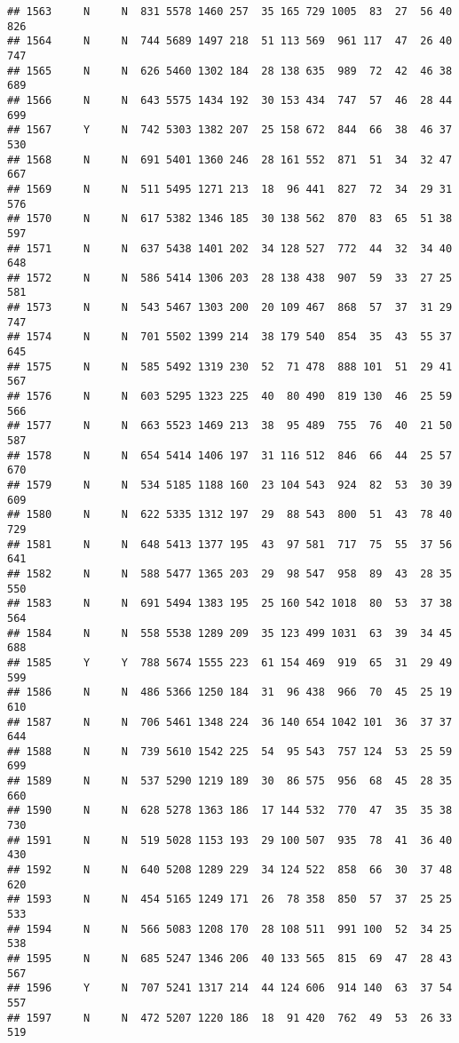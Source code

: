 \documentclass[]{article}
\begin{document}
\begin{verbatim}
## 1563     N     N  831 5578 1460 257  35 165 729 1005  83  27  56 40  826
## 1564     N     N  744 5689 1497 218  51 113 569  961 117  47  26 40  747
## 1565     N     N  626 5460 1302 184  28 138 635  989  72  42  46 38  689
## 1566     N     N  643 5575 1434 192  30 153 434  747  57  46  28 44  699
## 1567     Y     N  742 5303 1382 207  25 158 672  844  66  38  46 37  530
## 1568     N     N  691 5401 1360 246  28 161 552  871  51  34  32 47  667
## 1569     N     N  511 5495 1271 213  18  96 441  827  72  34  29 31  576
## 1570     N     N  617 5382 1346 185  30 138 562  870  83  65  51 38  597
## 1571     N     N  637 5438 1401 202  34 128 527  772  44  32  34 40  648
## 1572     N     N  586 5414 1306 203  28 138 438  907  59  33  27 25  581
## 1573     N     N  543 5467 1303 200  20 109 467  868  57  37  31 29  747
## 1574     N     N  701 5502 1399 214  38 179 540  854  35  43  55 37  645
## 1575     N     N  585 5492 1319 230  52  71 478  888 101  51  29 41  567
## 1576     N     N  603 5295 1323 225  40  80 490  819 130  46  25 59  566
## 1577     N     N  663 5523 1469 213  38  95 489  755  76  40  21 50  587
## 1578     N     N  654 5414 1406 197  31 116 512  846  66  44  25 57  670
## 1579     N     N  534 5185 1188 160  23 104 543  924  82  53  30 39  609
## 1580     N     N  622 5335 1312 197  29  88 543  800  51  43  78 40  729
## 1581     N     N  648 5413 1377 195  43  97 581  717  75  55  37 56  641
## 1582     N     N  588 5477 1365 203  29  98 547  958  89  43  28 35  550
## 1583     N     N  691 5494 1383 195  25 160 542 1018  80  53  37 38  564
## 1584     N     N  558 5538 1289 209  35 123 499 1031  63  39  34 45  688
## 1585     Y     Y  788 5674 1555 223  61 154 469  919  65  31  29 49  599
## 1586     N     N  486 5366 1250 184  31  96 438  966  70  45  25 19  610
## 1587     N     N  706 5461 1348 224  36 140 654 1042 101  36  37 37  644
## 1588     N     N  739 5610 1542 225  54  95 543  757 124  53  25 59  699
## 1589     N     N  537 5290 1219 189  30  86 575  956  68  45  28 35  660
## 1590     N     N  628 5278 1363 186  17 144 532  770  47  35  35 38  730
## 1591     N     N  519 5028 1153 193  29 100 507  935  78  41  36 40  430
## 1592     N     N  640 5208 1289 229  34 124 522  858  66  30  37 48  620
## 1593     N     N  454 5165 1249 171  26  78 358  850  57  37  25 25  533
## 1594     N     N  566 5083 1208 170  28 108 511  991 100  52  34 25  538
## 1595     N     N  685 5247 1346 206  40 133 565  815  69  47  28 43  567
## 1596     Y     N  707 5241 1317 214  44 124 606  914 140  63  37 54  557
## 1597     N     N  472 5207 1220 186  18  91 420  762  49  53  26 33  519

\end{verbatim}
\end{document}
